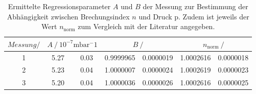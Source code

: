 \begin{table} 
\centering 
\caption{Ermittelte Regressionsparameter $A$ und $B$ der Messung zur Bestimmung der Abhängigkeit zwischen Brechungsindex $n$ und Druck p. Zudem ist jeweils der Wert $n_{\mathup{norm}}$ zum Vergleich mit der Literatur angegeben.} 
\label{tab: fitparams_druck} 
\begin{tabular}{S S[table-format=1.2]@{${}\pm{}$} S[table-format=1.2] S[table-format=1.7]@{${}\pm{}$} S[table-format=1.7] S[table-format=1.7]@{${}\pm{}$} S[table-format=1.7] } 
\toprule  
{$Messung / \si{ }$} &  &  &  \\ 
 & 5.27 & 0.03 & 0.9999965 & 0.0000019 & 1.0002616 & 0.0000018\\ 
2 & 5.23 & 0.04 & 1.0000007 & 0.0000024 & 1.0002619 & 0.0000023\\ 
3 & 5.20 & 0.04 & 1.0000036 & 0.0000026 & 1.0002616 & 0.0000025\\ 
\bottomrule 
\end{tabular} 
\end{table}